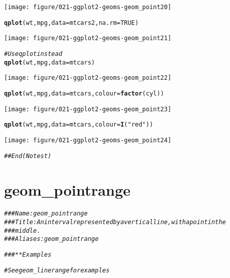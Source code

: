 \documentclass[a4paper,titlepage]{tufte-handout}\usepackage[]{graphicx}\usepackage[]{color}
\makeatletter
\def\maxwidth{ %
  \ifdim\Gin@nat@width>\linewidth
    \linewidth
  \else
    \Gin@nat@width
  \fi
}
\newcommand{\hlnum}[1]{\textcolor[rgb]{0.686,0.059,0.569}{#1}}%
\newcommand{\hlstr}[1]{\textcolor[rgb]{0.192,0.494,0.8}{#1}}%
\newcommand{\hlcom}[1]{\textcolor[rgb]{0.678,0.584,0.686}{\textit{#1}}}%
\newcommand{\hlstd}[1]{\textcolor[rgb]{0.345,0.345,0.345}{#1}}%
\newcommand{\hlkwc}[1]{\textcolor[rgb]{0.333,0.667,0.333}{#1}}%
\newcommand{\hlkwd}[1]{\textcolor[rgb]{0.737,0.353,0.396}{\textbf{#1}}}%
\newenvironment{kframe}{%
 \def\at@end@of@kframe{}%
 \ifinner\ifhmode%
  \def\at@end@of@kframe{\end{minipage}}%
  \begin{minipage}{\columnwidth}%
 \fi\fi%
 \def\FrameCommand##1{\hskip\@totalleftmargin \hskip-\fboxsep
 \colorbox{shadecolor}{##1}\hskip-\fboxsep
     \hskip-\linewidth \hskip-\@totalleftmargin \hskip\columnwidth}%
 \MakeFramed {\advance\hsize-\width
   \@totalleftmargin\z@ \linewidth\hsize
   \@setminipage}}%
 {\par\unskip\endMakeFramed%
 \at@end@of@kframe}
\newenvironment{knitrout}{}{} %
\makeatother
\begin{document}
\begin{knitrout}
\begin{kframe}
{\ttfamily\noindent\color{warningcolor}{\#\# Warning: Removed 11 rows containing missing values (geom\_point).}}\end{kframe}
\texttt{[image: figure/021-ggplot2-geoms-geom\_point20]} 
\begin{kframe}\begin{alltt}
\hlkwd{qplot}\hlstd{(wt, mpg,} \hlkwc{data} \hlstd{= mtcars2,} \hlkwc{na.rm} \hlstd{=} \hlnum{TRUE}\hlstd{)}
\end{alltt}
\end{kframe}
\texttt{[image: figure/021-ggplot2-geoms-geom\_point21]} 
\begin{kframe}\begin{alltt}
\hlcom{# Use qplot instead}
\hlkwd{qplot}\hlstd{(wt, mpg,} \hlkwc{data} \hlstd{= mtcars)}
\end{alltt}
\end{kframe}
\texttt{[image: figure/021-ggplot2-geoms-geom\_point22]} 
\begin{kframe}\begin{alltt}
\hlkwd{qplot}\hlstd{(wt, mpg,} \hlkwc{data} \hlstd{= mtcars,} \hlkwc{colour} \hlstd{=} \hlkwd{factor}\hlstd{(cyl))}
\end{alltt}
\end{kframe}
\texttt{[image: figure/021-ggplot2-geoms-geom\_point23]} 
\begin{kframe}\begin{alltt}
\hlkwd{qplot}\hlstd{(wt, mpg,} \hlkwc{data} \hlstd{= mtcars,} \hlkwc{colour} \hlstd{=} \hlkwd{I}\hlstd{(}\hlstr{"red"}\hlstd{))}
\end{alltt}
\end{kframe}
\texttt{[image: figure/021-ggplot2-geoms-geom\_point24]} 
\begin{kframe}\begin{alltt}
\hlcom{## End(No test)}
\end{alltt}
\end{kframe}
\end{knitrout}


\section{geom\_pointrange}

\begin{knitrout}
\color{fgcolor}\begin{kframe}
\begin{alltt}
\hlcom{### Name: geom_pointrange}
\hlcom{### Title: An interval represented by a vertical line, with a point in the}
\hlcom{###   middle.}
\hlcom{### Aliases: geom_pointrange}

\hlcom{### ** Examples}

\hlcom{# See geom_linerange for examples}
\end{alltt}
\end{kframe}
\end{knitrout}
\end{document}
